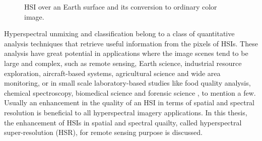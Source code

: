 \begin{figure}[t]
{
    }
    \caption{HSI over an Earth surface and its conversion to ordinary color image.}
    \label{fig:INTRO_HSI}
\end{figure}

Hyperspectral unmixing and classification belong to a class of quantitative
analysis techniques that retrieve useful information from the pixels of HSIs.
These analysis have great potential in applications where the image scenes
tend to be large and complex, such as remote sensing, Earth science,
industrial resource exploration, aircraft-based systems, agricultural science
and wide area monitoring, or in small scale laboratory-based studies like food
quality analysis, chemical spectroscopy, biomedical science and forensic
science
\cite{IMG_SPECTROMETRY_FOR_EARTH_REMOTE_SENSING,
      ADV_IN_HS_REMOTE_SENSING_FOR_GEO_MAP,
      A_REVIEW_ON_APPL_OF_NIR_SPECTRO_AND_CHEM_FOR_AGROFOOD_PROC_INDST,
      HSI_FOR_FOOD_APPL,
      APPL_OF_ICA_WITH_JADE_ALGO_AND_NIR_HSI_FOR_REVEALING_FOOD_ADULTERATION},
to mention a few.
Usually an enhancement in the quality of an HSI in terms of spatial and
spectral resolution is beneficial to all hyperspectral imagery applications.
In this thesis, the enhancement of HSIs in spatial and spectral quailty,
called hyperspectral super-resolution (HSR), for remote sensing purpose is
discussed.

